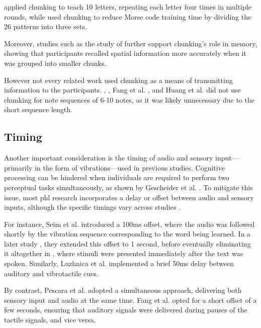  applied chunking to teach 10 letters, repeating each letter four times in multiple rounds, while  used chunking to reduce Morse code training time by dividing the 26 patterns into three sets.

Moreover, studies such as the study of  further support chunking’s role in memory, showing that participants recalled spatial information more accurately when it was grouped into smaller chunks.

However not every related work used chunking as a means of transmitting information to the participants. , , Fang et al. \cite{Fang2023a, Fang2023}, and Huang et al. \cite{Huang2008} did not use chunking for note sequences of 6-10 notes, as it was likely unnecessary due to the short sequence length.

\subsection*{Timing}
Another important consideration is the timing of audio and sensory input—primarily in the form of vibrations—used in previous studies. Cognitive processing can be hindered when individuals are required to perform two perceptual tasks simultaneously, as shown by Gescheider et al. \cite{Gescheider1975}. To mitigate this issue, most \gls{phl} research incorporates a delay or offset between audio and sensory inputs, although the specific timings vary across studies \cite{Seim2014, Seim2017, Luzhnica2018, Fang2023a}.

For instance, Seim et al. \cite{Seim2014} introduced a 100ms offset, where the audio was followed shortly by the vibration sequence corresponding to the word being learned. In a later study \cite{Seim2016}, they extended this offset to 1 second, before eventually eliminating it altogether in \cite{Seim2017}, where stimuli were presented immediately after the text was spoken. Similarly, Luzhnica et al. \cite{Luzhnica2018} implemented a brief 50ms delay between auditory and vibrotactile cues.

By contrast, Pescara et al. \cite{Pescara2019} adopted a simultaneous approach, delivering both sensory input and audio at the same time. Fang et al. \cite{Fang2023a} opted for a short offset of a few seconds, ensuring that auditory signals were delivered during pauses of the tactile signals, and vice versa.





